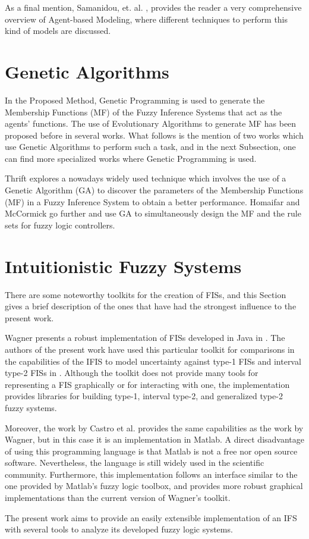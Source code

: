As a final mention, Samanidou, et. al. \cite{Samanidou_2007}, provides the
reader a very comprehensive overview of Agent-based Modeling, where different
techniques to perform this kind of models are discussed.

\section{Genetic Algorithms}
\label{section:genetic-algorithms}

In the Proposed Method, Genetic Programming is used to generate the Membership
Functions (MF) of the Fuzzy Inference Systems that act as the agents'
functions. The use of Evolutionary Algorithms to generate MF has been proposed
before in several works. What follows is the mention of two works which use
Genetic Algorithms to perform such a task, and in the next Subsection, one can
find more specialized works where Genetic Programming is used.

Thrift \cite{Thrift1991} explores a nowadays widely used technique which
involves the use of a Genetic Algorithm (GA) to discover the parameters of the
Membership Functions (MF) in a Fuzzy Inference System to obtain a better
performance. Homaifar and McCormick \cite{Homaifar1995} go further and use GA to
simultaneously design the MF and the rule sets for fuzzy logic controllers.

\section{Intuitionistic Fuzzy Systems}
\label{section:related-work-intuitionistic-fuzzy-systems}

There are some noteworthy toolkits for the creation of FISs, and this Section
gives a brief description of the ones that have had the strongest influence to
the present work.

Wagner presents a robust implementation of FISs developed in Java in
\cite{Wagner2013}. The authors of the present work have used this particular
toolkit for comparisons in the capabilities of the IFIS to model uncertainty
against type-1 FISs and interval type-2 FISs in
\cite{Hernandez-Aguila2016}. Although the toolkit does not provide many tools
for representing a FIS graphically or for interacting with one, the
implementation provides libraries for building type-1, interval type-2, and
generalized type-2 fuzzy systems.

Moreover, the work by Castro et al. \cite{castro2007interval} provides the same
capabilities as the work by Wagner, but in this case it is an implementation in
Matlab. A direct disadvantage of using this programming language is that Matlab
is not a free nor open source software.  Nevertheless, the language is still
widely used in the scientific community. Furthermore, this implementation
follows an interface similar to the one provided by Matlab's fuzzy logic
toolbox, and provides more robust graphical implementations than the current
version of Wagner's toolkit.

The present work aims to provide an easily extensible implementation of an IFS
with several tools to analyze its developed fuzzy logic systems.